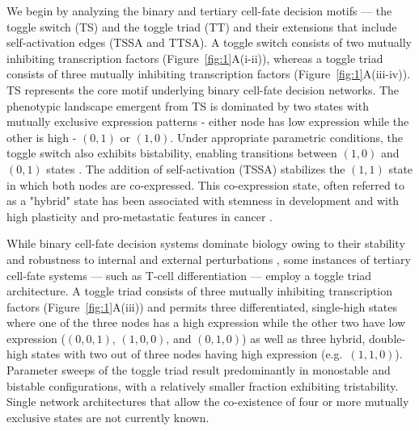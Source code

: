 \documentclass[11pt]{article}
\begin{document}
We begin by analyzing the binary and tertiary cell-fate decision motifs --- the toggle switch (TS) and the toggle triad (TT) and their extensions that include self-activation edges (TSSA and TTSA). A toggle switch consists of two mutually inhibiting transcription factors (Figure~\ref{fig:1}A(i-ii)), whereas a toggle triad consists of three mutually inhibiting transcription factors (Figure~\ref{fig:1}A(iii-iv)). TS represents the core motif underlying binary cell-fate decision networks. The phenotypic landscape emergent from TS is dominated by two states with mutually exclusive expression patterns - either node has low expression while the other is high - $(0,1)$ or $(1,0)$. Under appropriate parametric conditions, the toggle switch also exhibits bistability, enabling transitions between $(1,0)$ and $(0,1)$ states \cite{gardner2000construction}. The addition of self-activation (TSSA) stabilizes the $(1,1)$ state in which both nodes are co-expressed. This co-expression state, often referred to as a "hybrid" state has been associated with stemness in development \cite{Roeder2006TowardsPU.1} and with high plasticity and pro-metastatic features in cancer \cite{Pastushenko2019EMTMetastasis}.

While binary cell-fate decision systems dominate biology owing to their stability and robustness to internal and external perturbations \cite{harlapur2022functional, Shyam2025MutuallyNetworks}, some instances of tertiary cell-fate systems --- such as T-cell differentiation --- employ a toggle triad architecture. A toggle triad consists of three mutually inhibiting transcription factors (Figure~\ref{fig:1}A(iii)) and permits three differentiated, single-high states where one of the three nodes has a high expression while the other two have low expression ($(0,0,1)$, $(1,0,0)$, and $(0,1,0)$) as well as three hybrid, double-high states with two out of three nodes having high expression (e.g.\ $(1,1,0)$). Parameter sweeps of the toggle triad result predominantly in monostable and bistable configurations, with a relatively smaller fraction exhibiting tristability. Single network architectures that allow the co-existence of four or more mutually exclusive states are not currently known.
\end{document}
